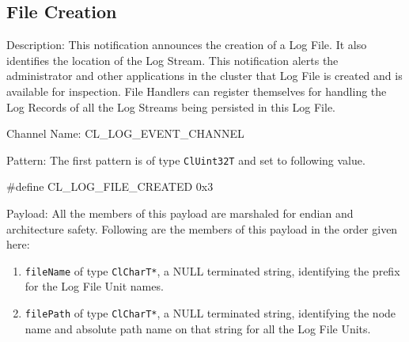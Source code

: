 \begin{flushleft}
\subsection{File Creation}
\begin{Desc}
\item[Description:]
This notification announces the creation of a Log File. It also identifies the location of the Log Stream. This notification alerts the administrator
and other applications in the cluster that Log File is created and is available for inspection. File Handlers can register themselves for handling
the Log Records of all the Log Streams being persisted in this Log File.
\end{Desc}
\begin{Desc}
\item[Channel Name:]
CL\_\-LOG\_\-EVENT\_\-CHANNEL
\end{Desc}
\begin{Desc}
\item[Pattern:]
The first pattern is of type {\tt{ClUint32T}} and set to following value.\par
\#define CL\_\-LOG\_\-FILE\_\-CREATED	0x3
\end{Desc}
\begin{Desc}
\item[Payload:]
All the members of this payload are marshaled for endian and architecture safety. Following are the members of this payload in the order given here:
\begin{enumerate}
\item
{\tt{fileName}} of type {\tt{ClCharT*}}, a NULL terminated string, identifying the prefix for the Log File Unit names.
\item
{\tt{filePath}} of type {\tt{ClCharT*}}, a NULL terminated string, identifying the node name and absolute path name on that string for all the Log File 
Units.
\end{enumerate}
\end{Desc}



\end{flushleft}
